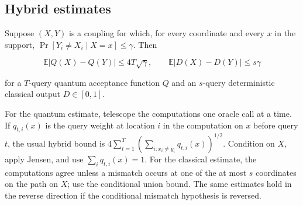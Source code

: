 \subsection{Hybrid estimates}\label{exch:sec-1}

Suppose \((X,Y)\) is a coupling for which, for every coordinate and
every \(x\) in the support, \(\Pr[Y_i\ne X_i\mid X=x]\le\gamma\). Then

\[
\mathbb E|Q(X)-Q(Y)|\le4T\sqrt\gamma,\qquad
\mathbb E|D(X)-D(Y)|\le s\gamma
\]

for a \(T\)-query quantum acceptance function \(Q\) and an \(s\)-query
deterministic classical output \(D\in[0,1]\).

For the quantum estimate, telescope the computations one oracle call at
a time. If \(q_{t,i}(x)\) is the query weight at location \(i\) in the
computation on \(x\) before query \(t\), the usual hybrid bound is
\(4\sum_{t=1}^T(\sum_{i:x_i\ne y_i}q_{t,i}(x))^{1/2}\). Condition on
\(X\), apply Jensen, and use \(\sum_iq_{t,i}(x)=1\). For the classical
estimate, the computations agree unless a mismatch occurs at one of the
at most \(s\) coordinates on the path on \(X\); use the conditional
union bound. The same estimates hold in the reverse direction if the
conditional mismatch hypothesis is reversed.
